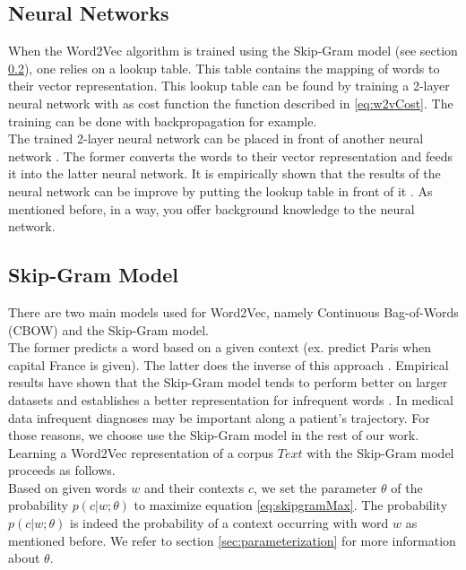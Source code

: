 \subsection{Neural Networks}

When the Word2Vec algorithm is trained using the Skip-Gram model (see section \ref{sec:skipgram}), one relies on a lookup table. This table contains the mapping of words to their vector representation. This lookup table can be found by training a 2-layer neural network with as cost function the function described in \ref{eq:w2vCost}. The training can be done with backpropagation for example. \\
The trained 2-layer neural network can be placed in front of another neural network \cite{w2vNN:online}. The former converts the words to their vector representation and feeds it into the latter neural network. It is empirically shown that the results of the neural network can be improve by putting the lookup table in front of it \cite{w2vOriginal:article}. As mentioned before, in a way, you offer background knowledge to the neural network.

\subsection{Skip-Gram Model}
\label{sec:skipgram}

There are two main models used for Word2Vec, namely Continuous Bag-of-Words (CBOW) and the Skip-Gram model. \\
The former predicts a word based on a given context (ex. predict Paris when capital France is given). The latter does the inverse of this approach \cite{w2vModels:article}. Empirical results have shown that the Skip-Gram model tends to perform better on larger datasets \cite{w2vReason1:online} and establishes a better representation for infrequent words \cite{w2vArchive:online}. In medical data infrequent diagnoses may be important along a patient's trajectory. For those reasons, we choose use the Skip-Gram model in the rest of our work. \\

Learning a Word2Vec representation of a corpus $Text$ with the Skip-Gram model proceeds as follows. \\
Based on given words $w$ and their contexts $c$, we set the parameter $\theta$ of the probability $p(c|w;\theta)$ to maximize equation \ref{eq:skipgramMax}. The probability $p(c|w;\theta)$ is indeed the probability of a context occurring with word $w$ as mentioned before. We refer to section \ref{sec:parameterization} for more information about $\theta$.

